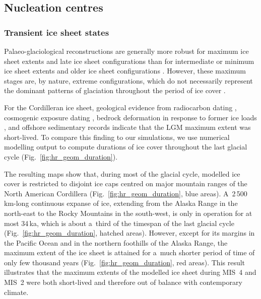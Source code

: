 \documentclass[tc, manuscript]{copernicus}
\begin{document}
\subsection{Nucleation centres}

\subsubsection{Transient ice sheet states}

      Palaeo-glaciological reconstructions are generally more robust for
      maximum ice sheet extents and late ice sheet configurations than for
      intermediate or minimum ice sheet extents and older ice sheet
      configurations \citep{Kleman.etal.2010}. However, these maximum stages
      are, by nature, extreme configurations, which do not necessarily
      represent the dominant patterns of glaciation throughout the period of
      ice cover \citep{Porter.1989, Kleman.Stroeven.1997, Kleman.etal.2008,
      Kleman.etal.2010}.

      For the Cordilleran ice sheet, geological evidence from radiocarbon
      dating \citep{Clague.etal.1980, Clague.1985, Clague.1986,
      Porter.Swanson.1998, Menounos.etal.2008}, cosmogenic exposure dating
      \citep{Stroeven.etal.2010, Stroeven.etal.2014, Margold.etal.2014},
      bedrock deformation in response to former ice loads
      \citep{Clague.James.2002, Clague.etal.2005}, and offshore sedimentary
      records \citep{Cosma.etal.2008, Davies.etal.2011} indicate that the
      LGM maximum extent was short-lived. To compare this finding to our
      simulations, we use numerical modelling output to compute durations of
      ice cover throughout the last glacial cycle
      (Fig.~\ref{fig:hr_geom_duration}).

      The resulting maps show that, during most of the glacial cycle,
      modelled ice cover is restricted to disjoint ice caps centred on major
      mountain ranges of the North American Cordillera
      (Fig.~\ref{fig:hr_geom_duration}, blue areas). A~2\,500\,\unit{km}-long
      continuous expanse of ice, extending from the Alaska Range in the
      north-east to the Rocky Mountains in the south-west, is only in
      operation for at most 34\,\unit{ka}, which is about a~third of the
      timespan of the last glacial cycle (Fig.~\ref{fig:hr_geom_duration},
      hatched areas). However, except for its margins in the Pacific Ocean
      and in the northern foothills of the Alaska Range, the maximum extent
      of the ice sheet is attained for a~much shorter period of time of only
      few thousand years (Fig.~\ref{fig:hr_geom_duration}, red areas). This
      result illustrates that the maximum extents of the modelled ice sheet
      during MIS~4 and MIS~2 were both short-lived and therefore out of
      balance with contemporary climate.
\end{document}
